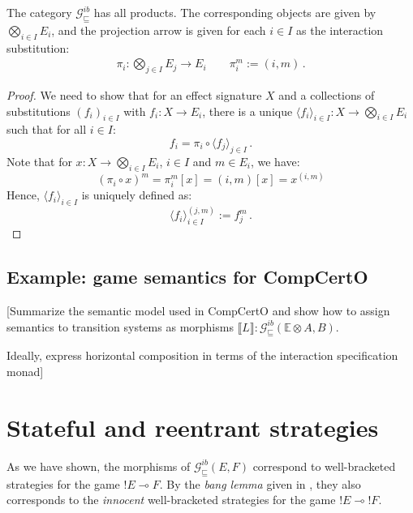 \documentclass[format=sigplan,authordraft]{acmart}
\newcommand{\gcat}{\mathcal{G}_{\sqsubseteq}}
\begin{document}
\begin{lemma}
The category $\gcat^{ib}$ has all products.
The corresponding objects are given by $\bigotimes_{i \in I} E_i$,
and the projection arrow
is given for each $i \in I$ as
the interaction substitution:
\begin{gather*}
    \pi_i : \bigotimes_{j \in I} E_j \rightarrow E_i \qquad
    \pi_i^m := (i, m) \,.
\end{gather*}
\begin{proof}
We need to show that for an effect signature $X$
and a collections of substitutions $(f_i)_{i \in I}$ with
$f_i : X \rightarrow E_i$,
there is a unique
$\langle f_i \rangle_{i \in I} : X \rightarrow \bigotimes_{i \in I} E_i$
such that for all $i \in I$:
\[
    f_i = \pi_i \circ \langle f_j \rangle_{j \in I} \,.
\]
Note that for $x : X \rightarrow \bigotimes_{i \in I} E_i$,
$i \in I$ and $m \in E_i$, we have:
\[
    (\pi_i \circ x)^m = \pi_i^m[x] = (i, m) [x] = x^{(i, m)}
\]
Hence, $\langle f_i \rangle_{i \in I}$ is uniquely defined as:
\[
    \langle f_i \rangle_{i \in I}^{(j, m)} := f_j^m \,.
\]
\end{proof}
\end{lemma}


\subsection{Example: game semantics for CompCertO}

[Summarize the semantic model used in CompCertO
and show how to assign semantics to transition systems
as morphisms
$\llbracket L \rrbracket : \gcat^{ib}(\mathbb{E} \otimes A, B)$.

Ideally, express horizontal composition
in terms of the interaction specification monad]


\section{Stateful and reentrant strategies} \label{sec:gamesem} %


As we have shown,
the morphisms of $\gcat^{ib}(E, F)$
correspond to well-bracketed strategies
for the game ${!E} \multimap F$.
By the \emph{bang lemma} given in \cite{gamesem99},
they also corresponds to the
\emph{innocent} well-bracketed strategies
for the game ${!E} \multimap {!F}$.
\end{document}
